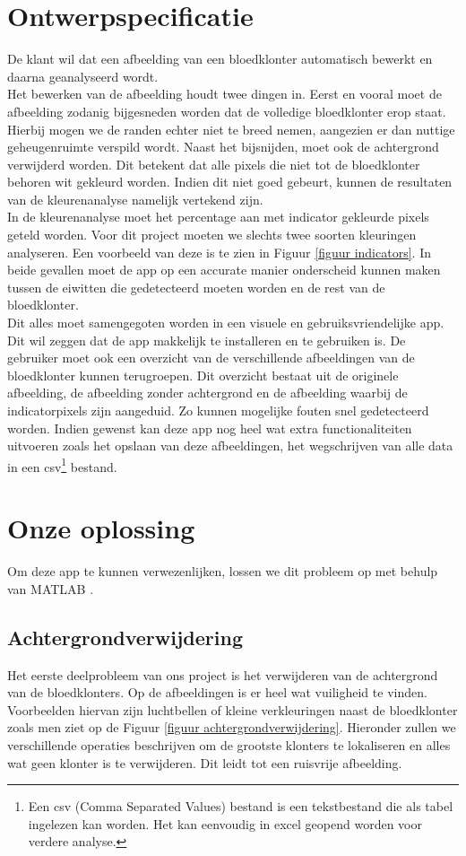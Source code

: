 \documentclass[a4paper,kulak]{kulakarticle}
\begin{document}
	\section{Ontwerpspecificatie}
		De klant wil dat een afbeelding van een bloedklonter automatisch bewerkt en daarna geanalyseerd wordt.\\
		Het bewerken van de afbeelding houdt twee dingen in. Eerst en vooral moet de afbeelding zodanig bijgesneden worden dat de volledige bloedklonter erop staat. Hierbij mogen we de randen echter niet te breed nemen, aangezien er dan nuttige geheugenruimte verspild wordt. 
		Naast het bijsnijden, moet ook de achtergrond verwijderd worden. Dit betekent dat alle pixels die niet tot de bloedklonter behoren wit gekleurd worden. Indien dit niet goed gebeurt, kunnen de resultaten van de kleurenanalyse namelijk vertekend zijn.\\
		In de kleurenanalyse moet het percentage aan met indicator gekleurde pixels geteld worden. Voor dit project moeten we slechts twee soorten kleuringen analyseren. Een voorbeeld van deze is te zien in Figuur \ref{figuur indicators}. In beide gevallen moet de app op een accurate manier onderscheid kunnen maken tussen de eiwitten die gedetecteerd moeten worden en de rest van de bloedklonter. \\
		Dit alles moet samengegoten worden in een visuele en gebruiksvriendelijke app. Dit wil zeggen dat de app makkelijk te installeren en te gebruiken is. De gebruiker moet ook een overzicht van de verschillende afbeeldingen van de bloedklonter kunnen terugroepen. Dit overzicht bestaat uit de originele afbeelding, de afbeelding zonder achtergrond en de afbeelding waarbij de indicatorpixels zijn aangeduid. Zo kunnen mogelijke fouten snel gedetecteerd worden. Indien gewenst kan deze app nog heel wat extra functionaliteiten uitvoeren zoals het opslaan van deze afbeeldingen, het wegschrijven van alle data in een csv\footnote{Een csv (Comma Separated Values) bestand is een tekstbestand die als tabel ingelezen kan worden. Het kan eenvoudig in excel geopend worden voor verdere analyse.} bestand.
	
	\section{Onze oplossing}
	Om deze app te kunnen verwezenlijken, lossen we dit probleem op met behulp van MATLAB \cite{matlab}.
		\subsection{Achtergrondverwijdering}
			Het eerste deelprobleem van ons project is het verwijderen van de achtergrond van de bloedklonters. Op de afbeeldingen is er heel wat vuiligheid te vinden. Voorbeelden hiervan zijn luchtbellen of kleine verkleuringen naast de bloedklonter zoals men ziet op de Figuur \ref{figuur achtergrondverwijdering}. Hieronder zullen we verschillende operaties beschrijven om de grootste klonters te lokaliseren en alles wat geen klonter is te verwijderen. Dit leidt tot een ruisvrije afbeelding.
\end{document}
